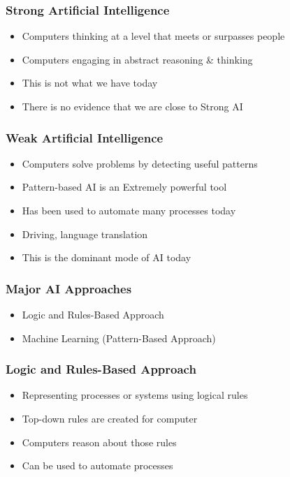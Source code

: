 \begin{frame}[fragile]\frametitle{Strong Artificial Intelligence}
\begin{itemize}
\item   Computers thinking at a level that meets or surpasses people
\item   Computers engaging in abstract reasoning \& thinking
\item   This is not what we have today
\item   There is no evidence that we are close to Strong AI
\end{itemize}
\end{frame}

\begin{frame}[fragile]\frametitle{Weak Artificial Intelligence}
\begin{itemize}
\item   Computers solve problems by detecting useful patterns
\item   Pattern-based AI is an Extremely powerful tool 
\item   Has been used to automate many processes today
\item   Driving, language translation
\item   This is the dominant mode of AI today
\end{itemize}
\end{frame}


\begin{frame}[fragile]\frametitle{Major AI Approaches}
\begin{itemize}
\item  Logic and Rules-Based Approach
\item  Machine Learning (Pattern-Based Approach)
\end{itemize}
\end{frame}

\begin{frame}[fragile]\frametitle{Logic and Rules-Based Approach}
\begin{itemize}
\item  Representing processes or systems using logical rules
\item Top-down rules are created for computer
\item Computers reason about those rules
\item Can be used to automate processes
\end{itemize}
\end{frame}

